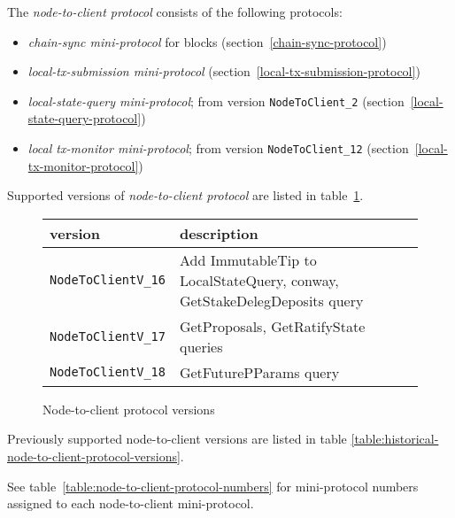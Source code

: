 The \textit{node-to-client protocol} consists of the following protocols:
\begin{itemize}
  \item \textit{chain-sync mini-protocol} for blocks (section~\ref{chain-sync-protocol})
  \item \textit{local-tx-submission mini-protocol} (section~\ref{local-tx-submission-protocol})
  \item \textit{local-state-query mini-protocol}; from version \texttt{NodeToClient\_2} (section~\ref{local-state-query-protocol})
  \item \textit{local tx-monitor mini-protocol}; from version \texttt{NodeToClient\_12} (section~\ref{local-tx-monitor-protocol})
\end{itemize}
Supported versions of \textit{node-to-client protocol} are listed in
table~\ref{table:node-to-client-protocol-versions}.
\begin{figure}[h]
  \begin{center}
    \begin{tabular}{l|l}
      version & description \\\hline\hline
      \texttt{NodeToClientV\_16} & Add ImmutableTip to LocalStateQuery, conway, GetStakeDelegDeposits query \\\hline
      \texttt{NodeToClientV\_17} & GetProposals, GetRatifyState queries \\\hline
      \texttt{NodeToClientV\_18} & GetFuturePParams query \\\hline
    \end{tabular}
    \caption{Node-to-client protocol versions}
    \label{table:node-to-client-protocol-versions}
  \end{center}
\end{figure}
\newline
Previously supported node-to-client versions are listed in table \ref{table:historical-node-to-client-protocol-versions}.

See table~\ref{table:node-to-client-protocol-numbers} for mini-protocol numbers
assigned to each node-to-client mini-protocol.
